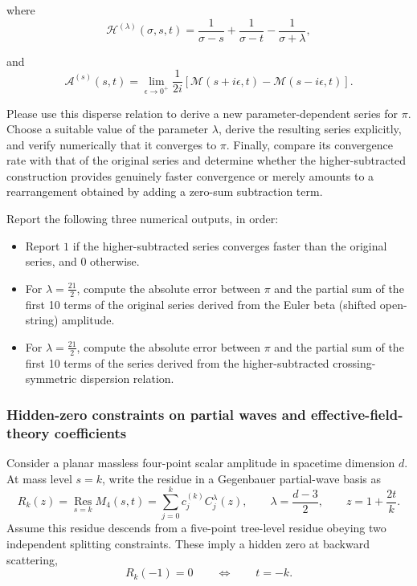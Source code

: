where 
\begin{equation}
\mathcal{H}^{(\lambda)}(\sigma,s,t)
=
\frac{1}{\sigma-s}
+
\frac{1}{\sigma-t}
-
\frac{1}{\sigma+\lambda},
\end{equation}

and
\begin{equation}
\mathcal{A}^{(s)}(s,t)
=
\lim_{\epsilon\to0^+}
\frac{1}{2i}
\left[
\mathcal{M}(s+i\epsilon,t)
-
\mathcal{M}(s-i\epsilon,t)
\right].
\end{equation}

Please use this disperse relation to derive a new parameter-dependent series for $\pi$. Choose a suitable value of the parameter $\lambda$, derive the resulting series explicitly, and verify numerically that it converges to $\pi$. Finally, compare its convergence rate with that of the original series and determine whether the higher-subtracted construction provides genuinely faster convergence or merely amounts to a rearrangement obtained by adding a zero-sum subtraction term.

Report the following three numerical outputs, in order:
\begin{itemize}
\item Report $1$ if the higher-subtracted series converges faster than the original series, and $0$ otherwise.
\item For $\lambda=\tfrac{21}{2}$, compute the absolute error between $\pi$ and the partial sum of the first 10 terms of the original series derived from the Euler beta (shifted open-string) amplitude.
\item For $\lambda=\tfrac{21}{2}$, compute the absolute error between $\pi$ and the partial sum of the first 10 terms of the series derived from the higher-subtracted crossing-symmetric dispersion relation.
\end{itemize}

\subsubsection{Hidden-zero constraints on partial waves and effective-field-theory coefficients}
\label{problem:hidden-zero-constraints}
Consider a planar massless four-point scalar amplitude in spacetime dimension \(d\). At mass level \(s=k\), write the residue in a Gegenbauer partial-wave basis as
\[
R_k(z)=\operatorname*{Res}_{s=k}M_4(s,t)
=\sum_{j=0}^{k}c_j^{(k)}C_j^{\lambda}(z),
\qquad
\lambda=\frac{d-3}{2},
\qquad
z=1+\frac{2t}{k}.
\]
Assume this residue descends from a five-point tree-level residue obeying two independent splitting constraints. These imply a hidden zero at backward scattering,
\[
R_k(-1)=0
\qquad\Longleftrightarrow\qquad
t=-k.
\]

